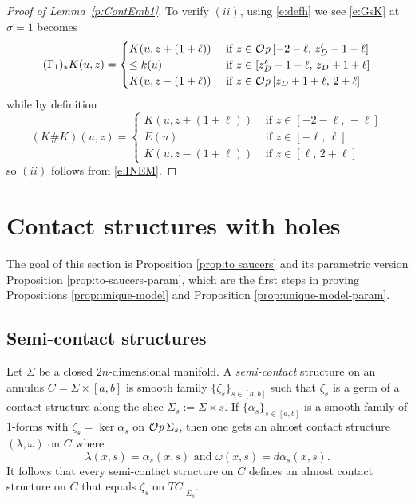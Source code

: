 \documentclass[12pt]{paper}
\theoremstyle{plain}
\theoremstyle{definition}
\def\Op{{\mathcal O}{\it p}\,}
\numberwithin{figure}{section}
\begin{document}
\begin{proof}[Proof of Lemma~\ref{p:ContEmb1}]
To verify $(ii)$, using \eqref{e:defh} we see \eqref{e:GsK} at $\sigma=1$ becomes
$$
	(\Gamma_1)_*K(u,z) = \begin{cases} K(u,z+(1+\ell)) & \mbox{ if } z \in \Op [-2-\ell,\, z_D'-1-\ell]\\
	\leq k(u) &  \mbox{ if } z \in [z_D' -1-\ell,\, z_D + 1+\ell]\\
	K(u,z-(1+\ell)) & \mbox{ if } z \in \Op [z_D+1+\ell,\, 2+\ell]
	\end{cases}
$$
while by definition
$$
	(K\# K)(u,z) = \begin{cases} K(u,z+(1+\ell)) & \mbox{ if } z \in [-2-\ell,\, -\ell]\\
	E(u) &  \mbox{ if } z \in [-\ell,\, \ell]\\
	K(u,z-(1+\ell)) & \mbox{ if } z \in [\ell,\, 2+\ell]
	\end{cases}
$$
so $(ii)$ follows from \eqref{e:INEM}.
\end{proof}



 


\section{Contact structures with holes}\label{sec:holes}  \label{sec:further}

The goal of this section is   Proposition \ref{prop:to saucers}
and its parametric version   Proposition \ref{prop:to-saucers-param}, which are the first steps in proving
    Propositions \ref{prop:unique-model}
and  Proposition  \ref{prop:unique-model-param}.


\subsection{Semi-contact structures}\label{sec:semi-holonomic}

Let $\Sigma$ be a closed $2n$-dimensional manifold. A {\em semi-contact} structure on an annulus $C=\Sigma\times[a,b]$ is smooth family $\{\zeta_s\}_{s \in [a,b]}$ such that $\zeta_s$ is a germ of a contact structure along the slice $\Sigma_s:=\Sigma\times s$.
If $\{\alpha_s\}_{s \in [a,b]}$ is a smooth family of $1$-forms with $\zeta_s = \ker \alpha_s$ on $\Op \Sigma_s$, then one gets an almost contact structure $(\lambda, \omega)$ on $C$ where
$$
\mbox{$\lambda(x,s) = \alpha_s(x,s)$ and $\omega(x,s) = d\alpha_s(x,s)$.}
$$
It follows that every semi-contact structure on $C$ defines an almost contact structure on $C$ that equals $\zeta_s$ on 
$TC|_{\Sigma_s}$. 
\end{document}

